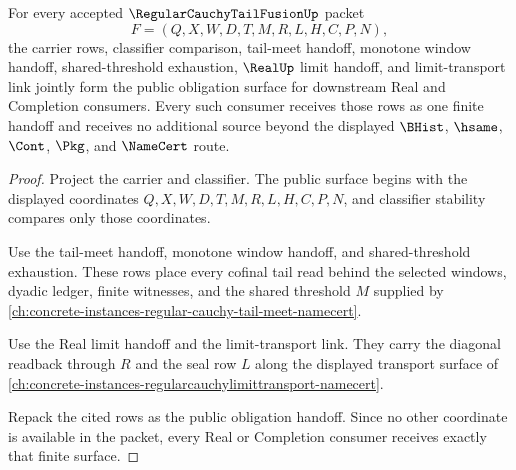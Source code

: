 \begin{theorem}
\label{thm:regular-cauchy-tail-fusion-public-obligation-handoff}
For every accepted $\RegularCauchyTailFusionUp$ packet
$$
F=(Q,X,W,D,T,M,R,L,H,C,P,N),
$$
the carrier rows, classifier comparison, tail-meet handoff, monotone window handoff, shared-threshold exhaustion, $\RealUp$ limit handoff, and limit-transport link jointly form the public obligation surface for downstream Real and Completion consumers. Every such consumer receives those rows as one finite handoff and receives no additional source beyond the displayed $\BHist$, $\hsame$, $\Cont$, $\Pkg$, and $\NameCert$ route.
\end{theorem}
\begin{proof}
Project the carrier and classifier. The public surface begins with the displayed coordinates $Q,X,W,D,T,M,R,L,H,C,P,N$, and classifier stability compares only those coordinates.

Use the tail-meet handoff, monotone window handoff, and shared-threshold exhaustion. These rows place every cofinal tail read behind the selected windows, dyadic ledger, finite witnesses, and the shared threshold $M$ supplied by \autoref{ch:concrete-instances-regular-cauchy-tail-meet-namecert}.

Use the Real limit handoff and the limit-transport link. They carry the diagonal readback through $R$ and the seal row $L$ along the displayed transport surface of \autoref{ch:concrete-instances-regularcauchylimittransport-namecert}.

Repack the cited rows as the public obligation handoff. Since no other coordinate is available in the packet, every Real or Completion consumer receives exactly that finite surface.
\end{proof}

